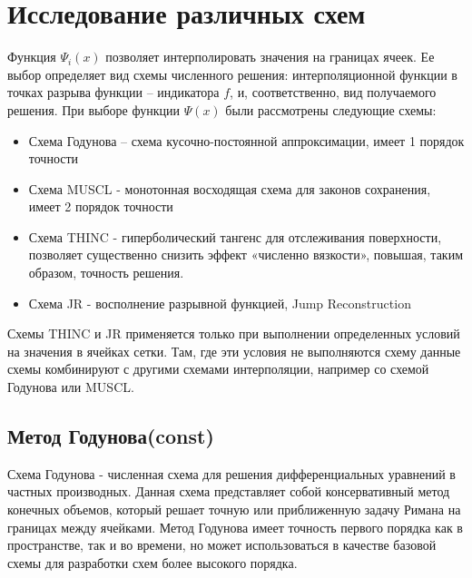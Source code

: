 \documentclass[12pt,a4paper]{article}
\begin{document}
\section{Исследование различных схем}
Функция $\Psi_i(x)$ позволяет интерполировать значения на границах ячеек. Ее выбор определяет вид схемы численного решения: интерполяционной функции в точках разрыва функции – индикатора $f$, и, соответственно, вид получаемого решения. При выборе функции $\Psi(x)$ были рассмотрены следующие схемы:
\begin{itemize}
	\item Схема Годунова – схема кусочно-постоянной аппроксимации, имеет 1 порядок точности
	\item Схема MUSCL - монотонная восходящая схема для законов сохранения, имеет 2 порядок точности
	\item Схема THINC - гиперболический тангенс для отслеживания поверхности, позволяет существенно снизить эффект «численно вязкости», повышая, таким образом, точность решения.
	\item Схема JR - восполнение разрывной функцией, Jump Reconstruction
\end{itemize}

Схемы THINC и JR применяется только при выполнении определенных условий на значения  в ячейках сетки. Там, где эти условия не выполняются схему данные схемы комбинируют с другими схемами интерполяции, например со схемой Годунова или MUSCL.

\subsection{Метод Годунова(const)}
Схема Годунова - численная схема для решения дифференциальных уравнений в частных производных. Данная схема представляет собой консервативный метод конечных объемов, который решает точную или приближенную задачу Римана на границах между ячейками. Метод Годунова имеет точность первого порядка как в пространстве, так и во времени, но может использоваться в качестве базовой схемы для разработки схем более высокого порядка.
\end{document}
